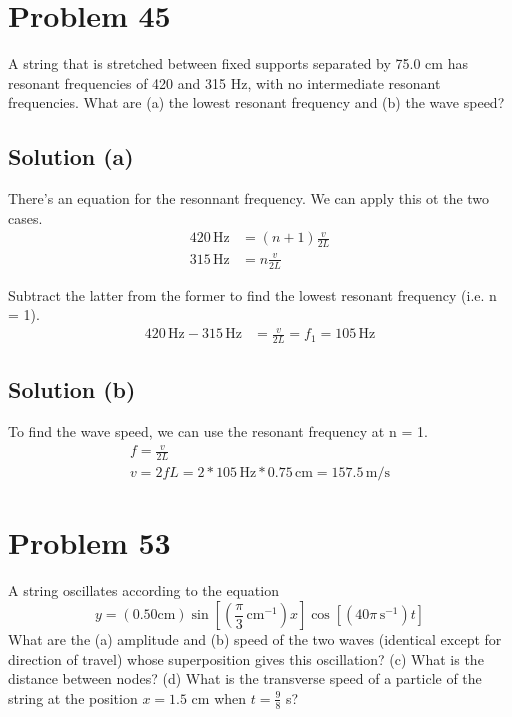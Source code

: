 \documentclass[12pt]{article}
\begin{document}
    \pagebreak
    \section{Problem 45}
        A string that is stretched between fixed supports separated by 75.0 cm has resonant frequencies of 420 and 315 Hz, with no intermediate resonant frequencies. 
        What are (a) the lowest resonant frequency and (b) the wave speed?

        \subsection{Solution (a)}
            There's an equation for the resonnant frequency.
            We can apply this ot the two cases.
            \begin{align}
                420\,\unit{\hertz}  &=  (n + 1)\frac{v}{2L}\\
                315\,\unit{\hertz}  &=  n\frac{v}{2L}
            \end{align}

            Subtract the latter from the former to find the lowest resonant frequency (i.e. n = 1).
            \begin{align}
                420\,\unit{\hertz} - 315\,\unit{\hertz} &=  \frac{v}{2L}
                    =   f_1
                    =   \boxed{105\,\unit{\hertz}}
            \end{align}

        \subsection{Solution (b)}
            To find the wave speed, we can use the resonant frequency at n = 1.
            \begin{gather}
                f   =   \frac{v}{2L}\\
                v   =   2fL
                    =   2 * 105\,\unit{\hertz} * 0.75\,\unit{\centi\meter}
                    =   \boxed{157.5\,\unit{\meter/\second}}
            \end{gather}

    \pagebreak
    \section{Problem 53}
        A string oscillates according to the equation
        \begin{equation}
            y = (0.50 \unit{\centi\meter}) \sin \left[  \left( \frac{\pi}{3}\,\unit{\centi\meter^{-1}} \right)x \right] \cos\left[ (40\pi\,\unit{\second^{-1}} )t \right]
        \end{equation}
        What are the (a) amplitude and (b) speed of the two waves (identical except for direction of travel) whose superposition gives this oscillation? 
        (c) What is the distance between nodes? 
        (d) What is the transverse speed of a particle of the string at the position $x = 1.5$ cm when $t = \frac{9}{8}$ s?
\end{document}
